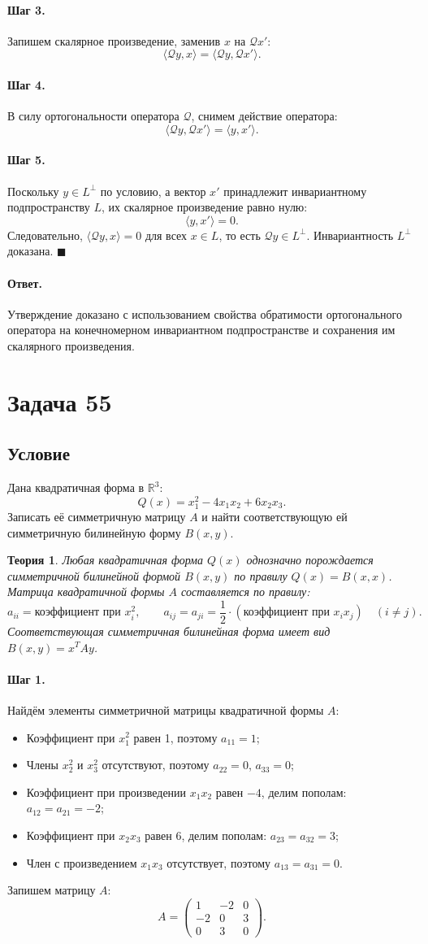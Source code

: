 \documentclass[12pt,a4paper]{article}
\theoremstyle{solution}
\newtheorem*{theory}{Теория}
\newcommand{\task}[1]{\newpage\section*{Задача #1}}
\newcommand{\answer}{\paragraph{Ответ.}}
\newcommand{\step}[1]{\paragraph{Шаг #1.}}
\begin{document}
\step{3} Запишем скалярное произведение, заменив $x$ на $\mathcal{Q}x'$:
\[
\langle \mathcal{Q}y, x\rangle = \langle \mathcal{Q}y, \mathcal{Q}x'\rangle.
\]

\step{4} В силу ортогональности оператора $\mathcal{Q}$, снимем действие оператора:
\[
\langle \mathcal{Q}y, \mathcal{Q}x'\rangle = \langle y, x'\rangle.
\]

\step{5} Поскольку $y \in L^\perp$ по условию, а вектор $x'$ принадлежит инвариантному подпространству $L$, их скалярное произведение равно нулю:
\[
\langle y, x'\rangle = 0.
\]
Следовательно, $\langle \mathcal{Q}y, x\rangle = 0$ для всех $x \in L$, то есть $\mathcal{Q}y \in L^\perp$. Инвариантность $L^\perp$ доказана. \quad$\blacksquare$

\answer
Утверждение доказано с использованием свойства обратимости ортогонального оператора на конечномерном инвариантном подпространстве и сохранения им скалярного произведения.

\task{55}
\subsection*{Условие}
Дана квадратичная форма в $\mathbb{R}^3$:
\[
Q(x) = x_1^2 - 4x_1 x_2 + 6x_2 x_3.
\]
Записать её симметричную матрицу $A$ и найти соответствующую ей симметричную билинейную форму $B(x, y)$.

\begin{theory}
Любая квадратичная форма $Q(x)$ однозначно порождается симметричной билинейной формой $B(x, y)$ по правилу $Q(x) = B(x, x)$. Матрица квадратичной формы $A$ составляется по правилу:
\[
a_{ii} = \text{коэффициент при } x_i^2, \qquad a_{ij} = a_{ji} = \frac{1}{2} \cdot \left(\text{коэффициент при } x_i x_j\right) \quad (i \neq j).
\]
Соответствующая симметричная билинейная форма имеет вид $B(x, y) = x^T A y$.
\end{theory}

\step{1} Найдём элементы симметричной матрицы квадратичной формы $A$:
\begin{itemize}
    \item Коэффициент при $x_1^2$ равен 1, поэтому $a_{11} = 1$;
    \item Члены $x_2^2$ и $x_3^2$ отсутствуют, поэтому $a_{22} = 0$, $a_{33} = 0$;
    \item Коэффициент при произведении $x_1 x_2$ равен $-4$, делим пополам: $a_{12} = a_{21} = -2$;
    \item Коэффициент при $x_2 x_3$ равен $6$, делим пополам: $a_{23} = a_{32} = 3$;
    \item Член с произведением $x_1 x_3$ отсутствует, поэтому $a_{13} = a_{31} = 0$.
\end{itemize}
Запишем матрицу $A$:
\[
A = \begin{pmatrix} 1 & -2 & 0 \\ -2 & 0 & 3 \\ 0 & 3 & 0 \end{pmatrix}.
\]
\end{document}
